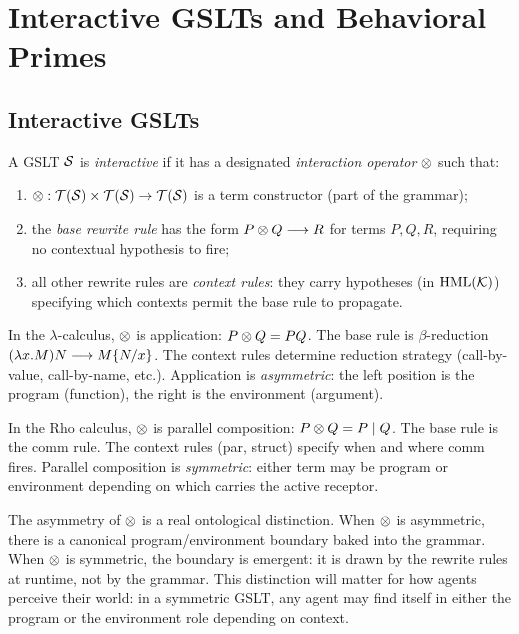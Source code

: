 \chapter{Interactive GSLTs and Behavioral Primes}
\label{sec:combinators}

\section{Interactive GSLTs}

\begin{definition}
A GSLT $\mathcal{S}$ is \emph{interactive} if it has a designated
\emph{interaction operator} $\otimes$ such that:
\begin{enumerate}[label=(\roman*)]
  \item $\otimes : \mathcal{T}(\mathcal{S}) \times \mathcal{T}(\mathcal{S}) \to \mathcal{T}(\mathcal{S})$
        is a term constructor (part of the grammar);
  \item the \emph{base rewrite rule} has the form
        $P \otimes Q \longrightarrow R$ for terms $P, Q, R$,
        requiring no contextual hypothesis to fire;
  \item all other rewrite rules are \emph{context rules}: they carry
        hypotheses (in $\mathrm{HML}(\mathcal{K})$) specifying which contexts
        permit the base rule to propagate.
\end{enumerate}
\end{definition}

\begin{example}
In the $\lambda$-calculus, $\otimes$ is application: $P \otimes Q = PQ$.
The base rule is $\beta$-reduction $(\lambda x.M)N \longrightarrow M\{N/x\}$.
The context rules determine reduction strategy
(call-by-value, call-by-name, etc.).
Application is \emph{asymmetric}: the left position is the program
(function), the right is the environment (argument).

In the Rho calculus, $\otimes$ is parallel composition: $P \otimes Q = P \mid Q$.
The base rule is the comm rule.
The context rules (par, struct) specify when and where comm fires.
Parallel composition is \emph{symmetric}: either term may be program
or environment depending on which carries the active receptor.
\end{example}

\begin{remark}
The asymmetry of $\otimes$ is a real ontological distinction.
When $\otimes$ is asymmetric, there is a canonical program/environment
boundary baked into the grammar.
When $\otimes$ is symmetric, the boundary is emergent: it is drawn by
the rewrite rules at runtime, not by the grammar.
This distinction will matter for how agents perceive their world:
in a symmetric GSLT, any agent may find itself in either the program
or the environment role depending on context.
\end{remark}

